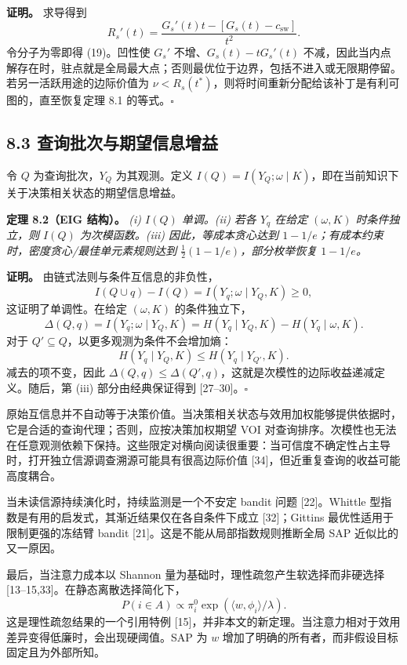 \documentclass[
  chinese,
  11pt]{article}
\begin{document}
\textbf{证明。} 求导得到 \[
R_s'(t)=\frac{G_s'(t)t-[G_s(t)-c_{\mathrm{sw}}]}{t^2}.
\] 令分子为零即得 (19)。凹性使 \(G_s'\) 不增、\(G_s(t)-tG_s'(t)\) 不减，因此当内点解存在时，驻点就是全局最大点；否则最优位于边界，包括不进入或无限期停留。若另一活跃用途的边际价值为 \(\nu<R_s(t^*)\)，则将时间重新分配给该补丁是有利可图的，直至恢复定理 8.1 的等式。\(\square\)

\subsection{8.3 查询批次与期望信息增益}\label{ux67e5ux8be2ux6279ux6b21ux4e0eux671fux671bux4fe1ux606fux589eux76ca}

令 \(Q\) 为查询批次，\(Y_Q\) 为其观测。定义 \(I(Q)=I(Y_Q;\omega\mid K)\)，即在当前知识下关于决策相关状态的期望信息增益。

\textbf{定理 8.2（EIG 结构）。} \emph{(i) \(I(Q)\) 单调。(ii) 若各 \(Y_q\) 在给定 \((\omega,K)\) 时条件独立，则 \(I(Q)\) 为次模函数。(iii) 因此，等成本贪心达到 \(1-1/e\)；有成本约束时，密度贪心/最佳单元素规则达到 \(\tfrac12(1-1/e)\)，部分枚举恢复 \(1-1/e\)。}

\textbf{证明。} 由链式法则与条件互信息的非负性， \[
I(Q\cup q)-I(Q)=I(Y_q;\omega\mid Y_Q,K)\geq0,
\] 这证明了单调性。在给定 \((\omega,K)\) 的条件独立下， \[
\Delta(Q,q)=I(Y_q;\omega\mid Y_Q,K)
=H(Y_q\mid Y_Q,K)-H(Y_q\mid\omega,K).
\] 对于 \(Q'\subseteq Q\)，以更多观测为条件不会增加熵： \[
H(Y_q\mid Y_Q,K)\leq H(Y_q\mid Y_{Q'},K).
\] 减去的项不变，因此 \(\Delta(Q,q)\leq\Delta(Q',q)\)，这就是次模性的边际收益递减定义。随后，第 (iii) 部分由经典保证得到 {[}27--30{]}。\(\square\)

原始互信息并不自动等于决策价值。当决策相关状态与效用加权能够提供依据时，它是合适的查询代理；否则，应按决策加权期望 VOI 对查询排序。次模性也无法在任意观测依赖下保持。这些限定对横向阅读很重要：当可信度不确定性占主导时，打开独立信源调查溯源可能具有很高边际价值 {[}34{]}，但近重复查询的收益可能高度耦合。

当未读信源持续演化时，持续监测是一个不安定 bandit 问题 {[}22{]}。Whittle 型指数是有用的启发式，其渐近结果仅在各自条件下成立 {[}32{]}；Gittins 最优性适用于限制更强的冻结臂 bandit {[}21{]}。这是不能从局部指数规则推断全局 SAP 近似比的又一原因。

最后，当注意力成本以 Shannon 量为基础时，理性疏忽产生软选择而非硬选择 {[}13--15,33{]}。在静态离散选择简化下， \[
P(i\in A)\propto\pi_i^0\exp(\langle w,\phi_i\rangle/\lambda).
\] 这是理性疏忽结果的一个引用特例 {[}15{]}，并非本文的新定理。当注意力相对于效用差异变得低廉时，会出现硬阈值。SAP 为 \(w\) 增加了明确的所有者，而非假设目标固定且为外部所知。
\end{document}

